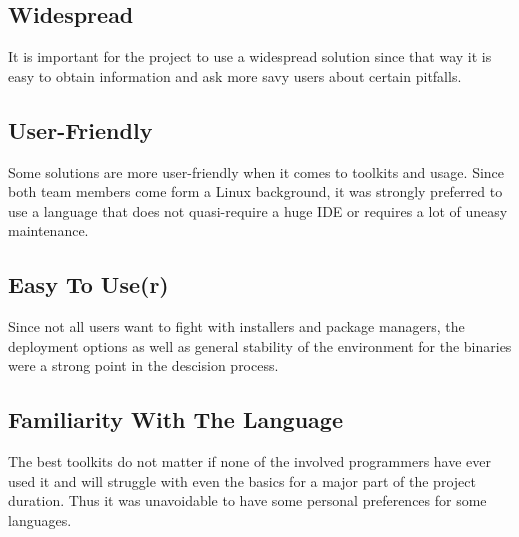 \subsection*{Widespread} It is important for the project to use a widespread solution since that way it is easy to obtain information and ask more savy users about certain pitfalls.

\subsection*{User-Friendly} Some solutions are more user-friendly when it comes to toolkits and usage. Since both team members come form a Linux background, it was strongly preferred to use a language that does not quasi-require a huge IDE or requires a lot of uneasy maintenance.

\subsection*{Easy To Use(r)} Since not all users want to fight with installers and package managers, the deployment options as well as general stability of the environment for the binaries were a strong point in the descision process.

\subsection*{Familiarity With The Language} The best toolkits do not matter if none of the involved programmers have ever used it and will struggle with even the basics for a major part of the project duration. Thus it was unavoidable to have some personal preferences for some languages.

